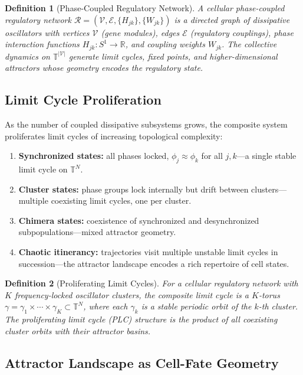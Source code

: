 \documentclass[preprint,12pt,amsmath,amssymb,superscriptaddress,floatfix]{revtex4-2}
\newcommand{\reals}{\mathbb{R}}
\newtheorem{definition}{Definition}[section]
\newcommand{\torus}{\mathbb{T}}
\begin{document}
\begin{definition}[Phase-Coupled Regulatory Network]
A cellular phase-coupled regulatory network
$\mathcal{R} = (\mathcal{V}, \mathcal{E}, \{H_{jk}\}, \{W_{jk}\})$
is a directed graph of dissipative oscillators with vertices $\mathcal{V}$
(gene modules), edges $\mathcal{E}$ (regulatory couplings), phase
interaction functions $H_{jk}: S^1 \to \reals$, and coupling weights
$W_{jk}$.  The collective dynamics on $\torus^{|\mathcal{V}|}$
generate limit cycles, fixed points, and higher-dimensional attractors
whose geometry encodes the regulatory state.
\end{definition}

\subsection{Limit Cycle Proliferation}

As the number of coupled dissipative subsystems grows, the composite
system proliferates limit cycles of increasing topological complexity:
\begin{enumerate}
    \item \textbf{Synchronized states:} all phases locked,
    $\phi_j \approx \phi_k$ for all $j,k$---a single stable limit cycle
    on $\torus^N$.
    \item \textbf{Cluster states:} phase groups lock internally but drift
    between clusters---multiple coexisting limit cycles, one per cluster.
    \item \textbf{Chimera states:} coexistence of synchronized and
    desynchronized subpopulations---mixed attractor geometry.
    \item \textbf{Chaotic itinerancy:} trajectories visit multiple
    unstable limit cycles in succession---the attractor landscape encodes
    a rich repertoire of cell states.
\end{enumerate}

\begin{definition}[Proliferating Limit Cycles]
\label{def:plc}
For a cellular regulatory network with $K$ frequency-locked oscillator
clusters, the composite limit cycle is a $K$-torus
$\gamma = \gamma_1 \times \cdots \times \gamma_K \subset \torus^N$,
where each $\gamma_k$ is a stable periodic orbit of the $k$-th cluster.
The \emph{proliferating limit cycle} (PLC) structure is the product
of all coexisting cluster orbits with their attractor basins.
\end{definition}

\subsection{Attractor Landscape as Cell-Fate Geometry}
\end{document}
